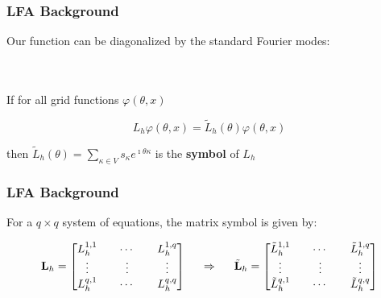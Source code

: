 \documentclass{beamer}
\begin{document}
\begin{frame}
\begin{center}
\frametitle{LFA Background}

Our function can be diagonalized by the standard Fourier modes:

~\\

~\\

If for all grid functions $\varphi \left( \theta, x \right)$

\vspace{-4mm}

\begin{equation}
L_h \varphi \left( \theta, x \right) = \tilde{L}_h \left( \theta \right) \varphi \left( \theta, x \right)
\end{equation}

then $\tilde{L}_h \left( \theta \right) = \sum_{\kappa \in V} s_\kappa e^{\imath \theta \kappa}$ is the {\bf symbol} of $L_h$\\

\end{center}
\end{frame}


\begin{frame}
\begin{center}
\frametitle{LFA Background}

For a $q \times q$ system of equations, the matrix symbol is given by:

\begin{equation}
\mathbf{L}_h =
\begin{bmatrix}
    L_h^{1, 1} && \cdots && L_h^{1, q}        \\
    \vdots               && \vdots && \vdots  \\
    L_h^{q, 1} && \cdots && L_h^{q, q}        \\
\end{bmatrix}
\hspace{0.5cm}
\Rightarrow
\hspace{0.5cm}
\tilde{\mathbf{L}}_h =
\begin{bmatrix}
    \tilde{L}_h^{1, 1} && \cdots && \tilde{L}_h^{1, q}  \\
    \vdots             && \vdots && \vdots              \\
    \tilde{L}_h^{q, 1} && \cdots && \tilde{L}_h^{q, q}  \\
\end{bmatrix}
\end{equation}

\end{center}
\end{frame}
\end{document}
